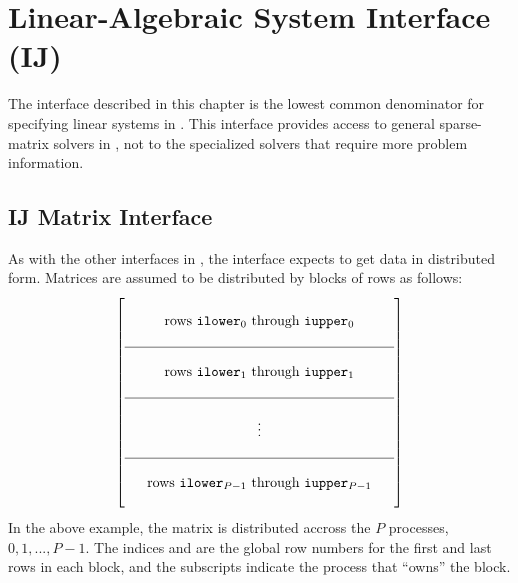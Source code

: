 \chapter{Linear-Algebraic System Interface (IJ)}
\label{Linear-Algebraic System Interface}

The  interface described in this chapter is the lowest common
denominator for specifying linear systems in \hypre{}.  This interface
provides access to general sparse-matrix solvers in \hypre{}, not
to the specialized solvers that require more problem information.


\section{IJ Matrix Interface}

As with the other interfaces in \hypre{}, the  interface
expects to get data in distributed form.  Matrices are assumed to be
distributed by blocks of rows as follows:
\begin{equation}
\left[
\begin{array}{c}
~~~~~~~~~~~~~~~~~~~~~~~~~~~~~~~~~~~~~~~~~~~~~~~~~~~~~~~ \\
\mbox{rows \code{ilower}$_0$ through \code{iupper}$_0$} \\
 \\
\hline
 \\
\mbox{rows \code{ilower}$_1$ through \code{iupper}$_1$} \\
 \\
\hline
 \\
\vdots \\
 \\
\hline
 \\
\mbox{rows \code{ilower}$_{P-1}$ through \code{iupper}$_{P-1}$} \\
 \\
\end{array}
\right]
\end{equation}
In the above example, the matrix is distributed accross the $P$
processes, $0, 1, ..., P-1$.  The indices  and
 are the global row numbers for the first and last rows
in each block, and the subscripts indicate the process that ``owns''
the block.

